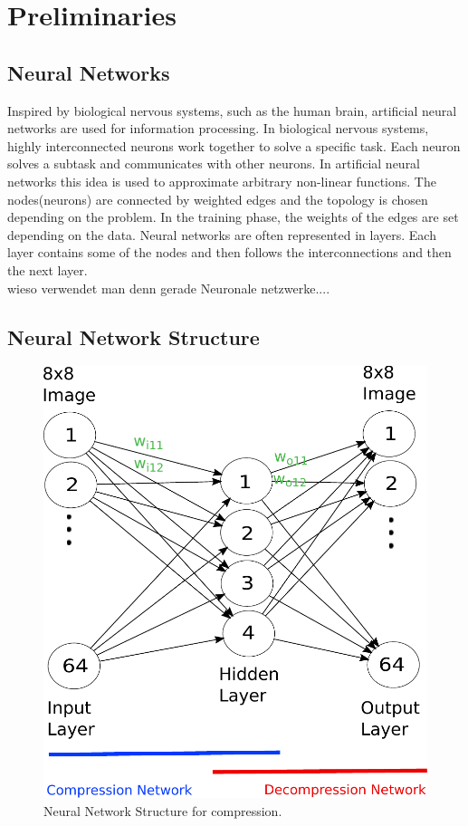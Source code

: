 \section{Preliminaries}
\label{sec:preliminaries}

\subsection{Neural Networks}
Inspired by biological nervous systems, such as the human brain, artificial neural networks are used for information processing. In biological nervous systems, highly interconnected neurons work together to solve a specific task. Each neuron solves a subtask and communicates with other neurons. In artificial neural networks this idea is used to approximate arbitrary  non-linear functions. The nodes(neurons) are connected by weighted edges and the topology is chosen depending on the problem. In the training phase, the weights of the edges are set depending on the data. Neural networks are often represented in layers. Each layer contains some of the nodes and then follows the interconnections and then the next layer. 
\\
wieso verwendet man denn gerade Neuronale netzwerke....
\subsection{Neural Network Structure}
\label{sec:neural_net_structure}
\begin{figure}[tbp]
  \centering
  \includegraphics[width=\columnwidth]{images/nnStructure}
  \caption{Neural Network Structure for compression.}
  \label{fig:nnStructure}
\end{figure}

